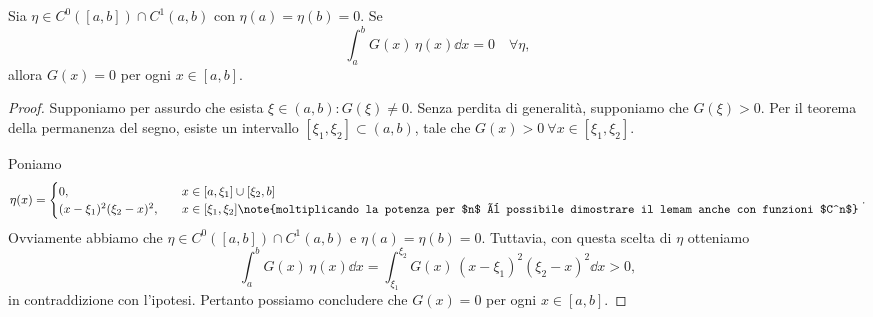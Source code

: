\begin{lemma}
    Sia $\eta \in C^0([a, b])\cap C^1(a, b)$ con $\eta(a) = \eta(b) = 0$. Se
    \begin{equation*}
        \int_{a}^{b} G(x)\,\eta(x)\dd{x} = 0 \quad \forall \eta,
    \end{equation*}
    allora $G(x) = 0$ per ogni $x\in [a, b]$.
\end{lemma}
\begin{proof}
    Supponiamo per assurdo che esista $\xi\in (a,b): G(\xi) \neq 0$. Senza perdita di generalità, supponiamo che $G(\xi) > 0$. Per il teorema della permanenza del segno, esiste un intervallo $[\xi_1, \xi_2] \subset (a, b)$, tale che $G(x) > 0\ \forall x\in [\xi_1, \xi_2]$.

    Poniamo
    \begin{equation*}
        \eta(x) = \begin{cases}
            0, \quad &x\in [a, \xi_1]\cup [\xi_2, b] \\
            (x-\xi_1)^2(\xi_2-x)^2, \quad &x\in [\xi_1, \xi_2]\note{moltiplicando la potenza per $n$ è possibile dimostrare il lemam anche con funzioni $C^n$}
        \end{cases}.
    \end{equation*}
    Ovviamente abbiamo che $\eta\in C^0([a, b])\cap C^1(a, b)$ e $\eta(a) = \eta(b) = 0$. Tuttavia, con questa scelta di $\eta$ otteniamo
    \begin{equation*}
        \int_{a}^{b} G(x)\,\eta(x)\dd{x} = \int_{\xi_1}^{\xi_2} G(x)\,(x-\xi_1)^2(\xi_2-x)^2\dd{x} > 0,
    \end{equation*}
    in contraddizione con l'ipotesi. Pertanto possiamo concludere che $G(x) = 0$ per ogni $x\in [a, b]$.
\end{proof}

